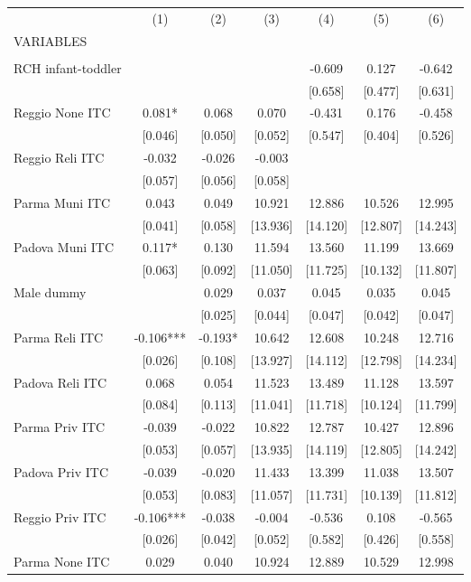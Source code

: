 \begin{tabular}{lcccccc} \hline
 & (1) & (2) & (3) & (4) & (5) & (6) \\
VARIABLES &  &  &  &  &  &  \\ \hline
 &  &  &  &  &  &  \\
RCH infant-toddler &  &  &  & -0.609 & 0.127 & -0.642 \\
 &  &  &  & [0.658] & [0.477] & [0.631] \\
Reggio None ITC & 0.081* & 0.068 & 0.070 & -0.431 & 0.176 & -0.458 \\
 & [0.046] & [0.050] & [0.052] & [0.547] & [0.404] & [0.526] \\
Reggio Reli ITC & -0.032 & -0.026 & -0.003 &  &  &  \\
 & [0.057] & [0.056] & [0.058] &  &  &  \\
Parma Muni ITC & 0.043 & 0.049 & 10.921 & 12.886 & 10.526 & 12.995 \\
 & [0.041] & [0.058] & [13.936] & [14.120] & [12.807] & [14.243] \\
Padova Muni ITC & 0.117* & 0.130 & 11.594 & 13.560 & 11.199 & 13.669 \\
 & [0.063] & [0.092] & [11.050] & [11.725] & [10.132] & [11.807] \\
Male dummy &  & 0.029 & 0.037 & 0.045 & 0.035 & 0.045 \\
 &  & [0.025] & [0.044] & [0.047] & [0.042] & [0.047] \\
Parma Reli ITC & -0.106*** & -0.193* & 10.642 & 12.608 & 10.248 & 12.716 \\
 & [0.026] & [0.108] & [13.927] & [14.112] & [12.798] & [14.234] \\
Padova Reli ITC & 0.068 & 0.054 & 11.523 & 13.489 & 11.128 & 13.597 \\
 & [0.084] & [0.113] & [11.041] & [11.718] & [10.124] & [11.799] \\
Parma Priv ITC & -0.039 & -0.022 & 10.822 & 12.787 & 10.427 & 12.896 \\
 & [0.053] & [0.057] & [13.935] & [14.119] & [12.805] & [14.242] \\
Padova Priv ITC & -0.039 & -0.020 & 11.433 & 13.399 & 11.038 & 13.507 \\
 & [0.053] & [0.083] & [11.057] & [11.731] & [10.139] & [11.812] \\
Reggio Priv ITC & -0.106*** & -0.038 & -0.004 & -0.536 & 0.108 & -0.565 \\
 & [0.026] & [0.042] & [0.052] & [0.582] & [0.426] & [0.558] \\
Parma None ITC & 0.029 & 0.040 & 10.924 & 12.889 & 10.529 & 12.998 \\

\end{tabular}

